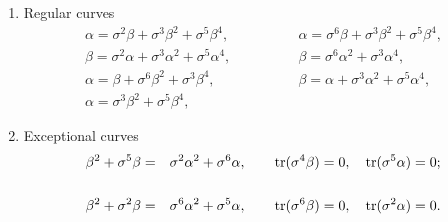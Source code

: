 \documentclass[quantumrep,article,submit,pdftex,moreauthors]{Definitions/mdpi}
\DeclareMathOperator{\tr}{tr}
\providecommand{\DIFaddbegin}{} %
\providecommand{\DIFaddend}{} %
\providecommand{\DIFdelbegin}{} %
\providecommand{\DIFdelend}{} %
\begin{document}
\begin{enumerate}[label = \alph*)]
  \item Regular curves 
    \begin{equation}
      \DIFdelbegin %
\DIFdelend \DIFaddbegin \begin{array}{ll}
        \alpha = \sigma^{2}\beta + \sigma^{3}\beta^{2} + \sigma^{5}\beta^{4},
        \qquad\qquad
        & \alpha = \sigma^{6}\beta + \sigma^{3}\beta^{2} + \sigma^{5}\beta^{4},
        \\[5pt] 
        \beta = \sigma^{2}\alpha + \sigma^{3}\alpha^{2} + \sigma^{5}\alpha^{4},
        \qquad\qquad
        & \beta = \sigma^{6}\alpha^{2} + \sigma^{3}\alpha^{4}, \\[5pt] 
        \alpha = \beta + \sigma^{6}\beta^{2} + \sigma^{3}\beta^{4},
        \qquad\qquad
        & \beta = \alpha + \sigma^{3}\alpha^{2} + \sigma^{5}\alpha^{4}, \\[5pt] 
        \alpha = \sigma^{3}\beta^{2} + \sigma^{5}\beta^{4},
        \qquad\qquad
        & 
      \end{array}\DIFaddend %
    \end{equation}

  \item Exceptional curves 
    \begin{eqnarray}
      \beta^{2}+\sigma^{5}\beta
      &=& \sigma^{2}\alpha^{2}+\sigma^{6}\alpha,
      \qquad \tr(\sigma^{4}\beta)=0,\quad \tr(\sigma^{5}\alpha) = 0;
      \DIFdelbegin %
\DIFdelend \DIFaddbegin \notag \DIFaddend \\
      && \\
      \beta^{2}+\sigma^{2}\beta
      &=& \sigma^{6}\alpha^{2} + \sigma^{5}\alpha,
      \qquad \tr(\sigma^{6}\beta) = 0,
      \quad \tr(\sigma^{2}\alpha) = 0.
      \DIFdelbegin %
\DIFdelend \DIFaddbegin \notag
    \DIFaddend \end{eqnarray}
\end{enumerate}
\end{document}
